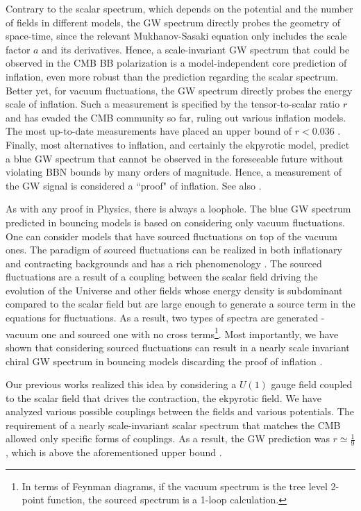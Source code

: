 \documentclass[12pt,a4paper]{article}
\numberwithin{equation}{section}
\numberwithin{equation}{section}
\begin{document}
Contrary to the scalar spectrum, which depends on the potential and the number of fields in different models, the GW spectrum directly probes the geometry of space-time, since the relevant Mukhanov-Sasaki equation only includes the scale factor $a$ and its derivatives. Hence, a scale-invariant GW spectrum that could be observed in the CMB BB polarization is a model-independent core prediction of inflation, even more robust than the prediction regarding the scalar spectrum. Better yet, for vacuum fluctuations, the GW spectrum directly probes the energy scale of inflation.
Such a measurement is specified by the tensor-to-scalar ratio $r$ and has evaded the CMB community so far, ruling out various inflation models. The most up-to-date measurements have placed an upper bound of $r<0.036$ \cite{Tristram:2021tvh,Tristram:2020wbi}.
Finally, most alternatives to inflation, and certainly the ekpyrotic model, predict a blue GW spectrum that cannot be observed in the foreseeable future without violating BBN bounds by many orders of magnitude.  Hence, a measurement of the GW signal is considered a  ``proof" of inflation. See also \cite{Brandenberger:2011eq,Chen:2018cgg,Vagnozzi:2022qmc}. 

As with any proof in Physics, there is always a loophole. The blue GW spectrum predicted in bouncing models is based on considering only vacuum fluctuations. One can consider models that have sourced fluctuations on top of the vacuum ones. The paradigm of sourced fluctuations can be realized in both inflationary and contracting backgrounds and has a rich phenomenology \cite{Chowdhury:2016aet, Chowdhury:2015cma, Chowdhury:2018blx, Gasperini:2017fqw, Ito:2016fqp, Lin:2015nda, Wang:2014kqa, Caprini:2014mja, Barnaby:2012xt,r1,r3}. The sourced fluctuations are a result of a coupling between the scalar field driving the evolution of the Universe and other fields whose energy density is subdominant compared to the scalar field but are large enough to generate a source term in the equations for fluctuations. As a result, two types of spectra are generated - vacuum one and sourced one with no cross terms\footnote{ In terms of Feynman diagrams, if the vacuum spectrum is the tree level 2-point function, the sourced spectrum is a 1-loop calculation.}.
Most importantly, we have shown that considering sourced fluctuations can result in a nearly scale invariant chiral GW spectrum in bouncing models discarding the proof of inflation \cite{r3,r1}. 

Our previous works realized this idea by considering a $U(1)$ gauge field coupled to the scalar field that drives the contraction, the ekpyrotic field. We have analyzed various possible couplings between the fields and various potentials. The requirement of a nearly scale-invariant scalar spectrum that matches the CMB allowed only specific forms of couplings. As a result, the GW prediction was $r\simeq \frac{1}{9}$, which is above the aforementioned upper bound \cite{Artymowski:2020pci}.
\end{document}
